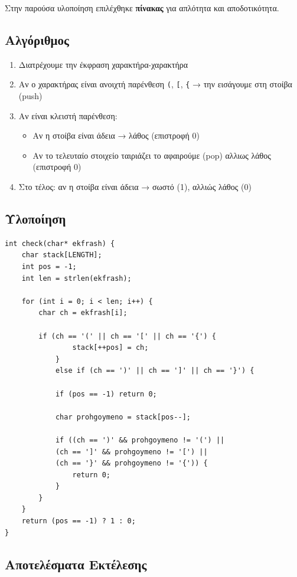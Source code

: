 \documentclass[a4paper,12pt]{article}
\begin{document}
	Στην παρούσα υλοποίηση επιλέχθηκε \textbf{πίνακας} για απλότητα και 
	αποδοτικότητα.
	
	\subsection{Αλγόριθμος}
	\begin{enumerate}
		\item Διατρέχουμε την έκφραση χαρακτήρα-χαρακτήρα
		\item Αν ο χαρακτήρας είναι ανοιχτή παρένθεση \texttt{(}, \texttt{[}, 
		\texttt{\{} → την εισάγουμε στη στοίβα (push)
		\item Αν είναι κλειστή παρένθεση:
		\begin{itemize}
			\item Αν η στοίβα είναι άδεια → λάθος (επιστροφή 0)
			\item Αν το τελευταίο στοιχείο ταιριάζει το αφαιρούμε (pop) αλλιως λάθος (επιστροφή 0)
		\end{itemize}
		\item Στο τέλος: αν η στοίβα είναι άδεια → σωστό (1), αλλιώς λάθος (0)
	\end{enumerate}
	
	\subsection{Υλοποίηση}
	
	\begin{lstlisting}
int check(char* ekfrash) {
	char stack[LENGTH];
	int pos = -1;
	int len = strlen(ekfrash);
	
	for (int i = 0; i < len; i++) {
		char ch = ekfrash[i];
		
		if (ch == '(' || ch == '[' || ch == '{') {
				stack[++pos] = ch;
			}
			else if (ch == ')' || ch == ']' || ch == '}') {
			
			if (pos == -1) return 0;
			
			char prohgoymeno = stack[pos--];
			
			if ((ch == ')' && prohgoymeno != '(') ||
			(ch == ']' && prohgoymeno != '[') ||
			(ch == '}' && prohgoymeno != '{')) {
				return 0;
			}
		}
	}
	return (pos == -1) ? 1 : 0;
}
	\end{lstlisting}
	
	\subsection{Αποτελέσματα Εκτέλεσης}
	
\end{document}
